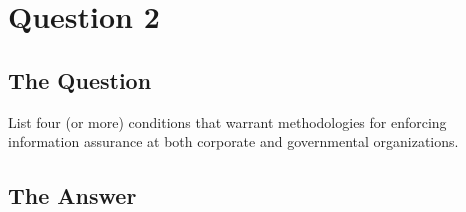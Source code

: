 \documentclass[11pt]{article}
\begin{document}
\section{\sc Question 2}

\subsection{The Question}

\begin{flushleft}

List four (or more) conditions that warrant methodologies for enforcing information assurance at both corporate and governmental organizations.

\end{flushleft}


\subsection{The Answer}
\end{document}
